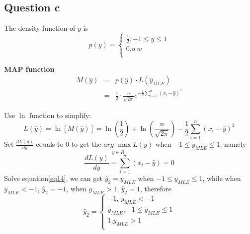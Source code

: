 \documentclass[12pt,letterpaper]{article}
\begin{document}
\subsection*{Question c}
The density function of $y$ is
\begin{equation}\label{eq11}
  p\left( y \right) =\begin{cases}
	\frac{1}{2},-1\leqslant y\leqslant 1\\
	\text{0,}o.w\\
\end{cases}
\end{equation}

{\bf MAP function}
\begin{eqnarray}\label{eq12}
M\left( \hat{y} \right)
&=& p\left( \hat{y} \right) \cdot L\left( \hat{y}_{MLE} \right)\\ \nonumber
&=& \frac{1}{2}\cdot \frac{n}{\sqrt{2\pi}}e^{-\frac{1}{2}\sum_{i=1}^n{\left( x_i-\hat{y}\right) ^2}}
\end{eqnarray}

Use $\ln$ function to simplify:
\begin{equation}\label{eq13}
  L(\hat{y})=\ln[ M(\hat{y})]=\ln(\frac{1}{2})+\ln(\frac{n}{\sqrt{2\pi}})-\frac{1}{2}\sum_{i=1}^n{\left( x_i-\hat{y} \right) ^2}
\end{equation}
Set $\frac{dL\left( y \right)}{dy}$ equals to 0 to get the $\underset{\hat{y}\in R}{arg\,\,\max}L\left( y \right) $ when $-1\leqslant y_{MLE}\leqslant 1$, namely
\begin{equation}\label{eq14}
  \frac{dL\left( y \right)}{dy}=\sum_{i=1}^n{\left( x_i-\hat{y} \right)}=0
\end{equation}
Solve equation\ref{eq14}, we can get $\hat{y}_2=y_{MLE}$ when $-1\leqslant y_{MLE}\leqslant 1$, while when $y_{MLE}<-1$, $\hat{y}_2=-1$, when $y_{MLE}>1$, $\hat{y}_2=1$, therefore
\begin{equation}\label{eq15}
  \hat{y}_2=\begin{cases}
	-\text{1, }y_{MLE}<-1\\
	y_{MLE}, -1\leqslant y_{MLE}\leqslant 1\\
	\text{1,}y_{MLE}>1\\
\end{cases}
\end{equation}
\end{document}
